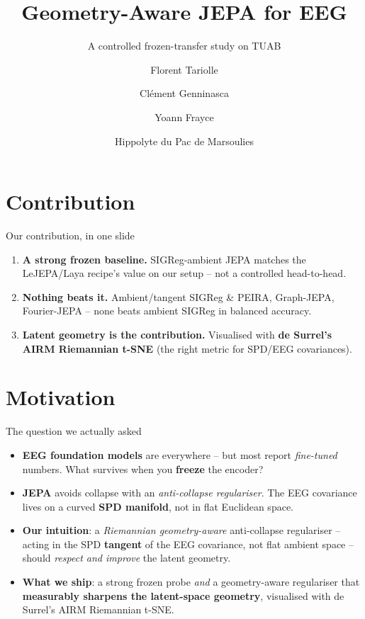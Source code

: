 \documentclass[aspectratio=169]{beamer}
\title{Geometry-Aware JEPA for EEG}
\subtitle{A controlled frozen-transfer study on TUAB}
\author{Florent Tariolle \and Cl\'ement Genninasca \and Yoann Frayce \and Hippolyte du Pac de Marsoulies}
\institute{Hack the World(s) -- EEG Track \quad$\cdot$\quad Team \textbf{HelloWorlds}}
\date{}
\begin{document}
{%
\begin{frame}
  \titlepage
\end{frame}
}

\section{Contribution}

\begin{frame}{Our contribution, in one slide}
  \small
  \begin{enumerate}
    \item \textbf{A strong frozen baseline.} SIGReg-ambient JEPA matches the LeJEPA/Laya recipe's value on our setup -- not a controlled head-to-head.
    \item \textbf{Nothing beats it.} Ambient/tangent SIGReg \& PEIRA, Graph-JEPA, Fourier-JEPA -- none beats ambient SIGReg in balanced accuracy.
    \item \textbf{Latent geometry is the contribution.} Visualised with \textbf{de Surrel's AIRM Riemannian t-SNE} (the right metric for SPD/EEG covariances).
  \end{enumerate}
\end{frame}

\section{Motivation}

\begin{frame}{The question we actually asked}
  \vfill
  \begin{itemize}
    \item \textbf{EEG foundation models} are everywhere -- but most report \emph{fine-tuned} numbers. What survives when you \textbf{freeze} the encoder?
    \item \textbf{JEPA} avoids collapse with an \emph{anti-collapse regulariser}. The EEG covariance lives on a curved \textbf{SPD manifold}, not in flat Euclidean space.
    \item \textbf{Our intuition}: a \emph{Riemannian geometry-aware} anti-collapse regulariser -- acting in the SPD \textbf{tangent} of the EEG covariance, not flat ambient space -- should \emph{respect and improve} the latent geometry.
    \item \textbf{What we ship}: a strong frozen probe \emph{and} a geometry-aware regulariser that \textbf{measurably sharpens the latent-space geometry}, visualised with de Surrel's AIRM Riemannian t-SNE.
  \end{itemize}
\end{frame}
\end{document}
